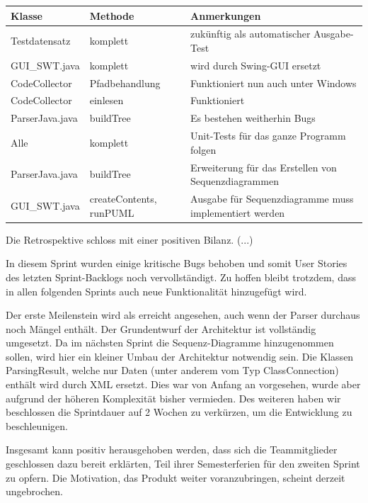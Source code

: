 \begin{table}[H]

\begin{tabularx}{\textwidth}{ |l|l|X| }
\hline
\textbf{Klasse} & \textbf{Methode} & \textbf{Anmerkungen}\\
 \hline
 
 Testdatensatz & komplett & zukünftig als automatischer Ausgabe-Test\\ \hline
 GUI\_SWT.java & komplett & wird durch Swing-GUI ersetzt\\ \hline
 CodeCollector & Pfadbehandlung & Funktioniert nun auch unter Windows\\ \hline
 CodeCollector & einlesen & Funktioniert\\ \hline
 ParserJava.java & buildTree & Es bestehen weitherhin Bugs\\ \hline
 Alle & komplett & Unit-Tests für das ganze Programm folgen\\ \hline
 ParserJava.java & buildTree & Erweiterung für das Erstellen von Sequenzdiagrammen\\ \hline
 GUI\_SWT.java & createContents, runPUML & Ausgabe für Sequenzdiagramme muss implementiert werden\\ \hline
 
\hline
\end{tabularx}
\end{table}

\nsecend%

Die Retrospektive schloss mit einer positiven Bilanz. (...)
\nsecend%

In diesem Sprint wurden einige kritische Bugs behoben und somit User Stories des letzten Sprint-Backlogs noch vervollständigt. Zu hoffen bleibt trotzdem, dass in allen folgenden Sprints auch neue Funktionalität hinzugefügt wird.
\nsecend%

Der erste Meilenstein wird als erreicht angesehen, auch wenn der Parser durchaus noch Mängel enthält. Der Grundentwurf der Architektur ist vollständig umgesetzt. Da im nächsten Sprint die Sequenz-Diagramme hinzugenommen sollen, wird hier ein kleiner Umbau der Architektur notwendig sein. Die Klassen ParsingResult, welche nur Daten (unter anderem vom Typ ClassConnection) enthält wird durch XML ersetzt. Dies war von Anfang an vorgesehen, wurde aber aufgrund der höheren Komplexität bisher vermieden. Des weiteren haben wir beschlossen die Sprintdauer auf 2 Wochen zu verkürzen, um die Entwicklung zu beschleunigen.
\nsecend%

Insgesamt kann positiv herausgehoben werden, dass sich die Teammitglieder geschlossen dazu bereit erklärten, Teil ihrer Semesterferien für den zweiten Sprint zu opfern. Die Motivation, das Produkt weiter voranzubringen, scheint derzeit ungebrochen.
\nsecend%